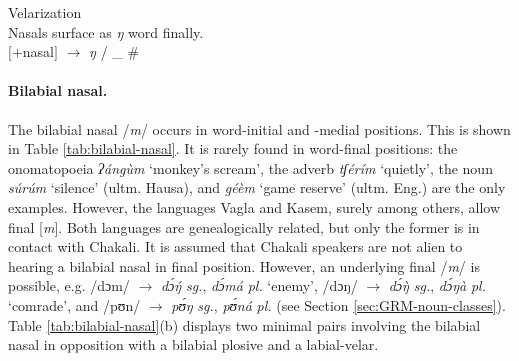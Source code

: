 \begin{Gen}\label{Gen-nas-vel}{Velarization}\\
Nasals surface as {\it ŋ} word finally.\\
$[${\sc +nasal}$]$  $\rightarrow$   {\it ŋ}  / \_ \#
\end{Gen}

% 
% 



\paragraph{Bilabial nasal.}
\label{sec:PHON-bil-nas}

The bilabial nasal /{\it m}/ occurs in word-initial and -medial positions. This 
is shown in Table \ref{tab:bilabial-nasal}. It is rarely  found in  word-final 
positions: the onomatopoeia {\it ʔángùm} `monkey's scream', the adverb {\it  
tʃérím} `quietly',   the noun {\it súrúm} `silence' (ultm. Hausa), and  {\it 
géèm} `game reserve' (ultm. Eng.) are the only examples.  However, the languages 
Vagla and Kasem, surely among others,  allow final [{\it m}]. Both languages are 
genealogically related,  but only the former is in contact with Chakali. It is 
assumed that Chakali speakers  are not alien to hearing   a bilabial nasal  in 
final position. However, an underlying final /{\it m}/ is possible, e.g. /dɔm/ 
$\rightarrow$ {\it dɔ́ŋ́} {\it sg.}, {\it dɔ́má}  {\it pl.} `enemy',   /dɔŋ/ 
$\rightarrow$ {\it dɔ́ŋ̀} {\it sg.}, {\it dɔ́ŋà}  {\it pl.}  `comrade', and 
/pʊn/ $\rightarrow$ {\it pʊ́ŋ} {\it sg.}, {\it pʊ́ná}  {\it pl.}   (see Section 
\ref{sec:GRM-noun-classes}). Table \ref{tab:bilabial-nasal}(b) displays two 
minimal pairs involving the bilabial nasal in opposition with a bilabial plosive 
and  a labial-velar.

